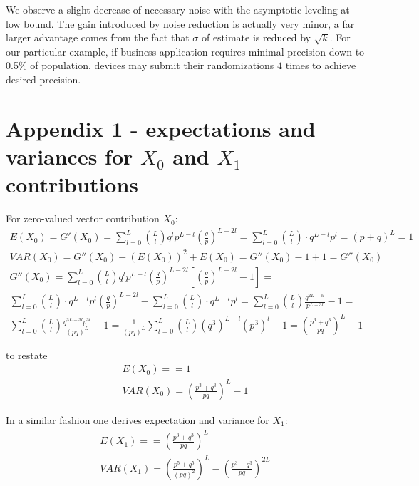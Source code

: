 \documentclass[11pt]{article}
\begin{document}
 We observe a slight decrease of necessary noise with the asymptotic leveling at low bound.  The gain introduced by noise reduction is actually very minor, a far larger advantage comes from the fact that $\sigma$ of estimate is reduced by $\sqrt{k}$.  For our particular example, if business application requires minimal precision down to 0.5\% of population, devices may submit their randomizations $4$ times to achieve desired precision.

\section{Appendix 1 - expectations and variances for $X_0$ and $X_1$ contributions}

For zero-valued vector contribution $X_0$:
\begin{align}
E(X_0)=  G'(X_0) = \sum_{l=0}^{L} \binom{L}{l} q^lp^{L-l} \left ( \frac{q}{p} \right )^ {L - 2l} = \sum_{l=0}^{L}  \binom{L}{l} \cdot q^{L-l}p^{l} = (p+q)^L = 1 \\
VAR(X_0)=  G''(X_0) - (E(X_0))^2 + E(X_0) = G''(X_0) - 1 + 1 =  G''(X_0) \\
 G''(X_0) = \sum_{l=0}^{L} \binom{L}{l} q^lp^{L-l} \left ( \frac{q}{p} \right )^ {L - 2l} \left [  \left ( \frac{q}{p} \right )^ {L - 2l} - 1 \right ] = \\
  \sum_{l=0}^{L}  \binom{L}{l} \cdot q^{L-l}p^{l}  \left ( \frac{q}{p} \right )^ {L - 2l}  - \sum_{l=0}^{L}  \binom{L}{l} \cdot q^{L-l}p^{l}  =   \sum_{l=0}^{L}  \binom{L}{l}   \frac{q^{2L-3l}}{p^{L-3l}}  - 1 = \\
\sum_{l=0}^{L}  \binom{L}{l}   \frac{q^{3L-3l} p^{3l}}{(pq)^{L}} - 1 =  \frac{1}{(pq)^{L}} \sum_{l=0}^{L}  \binom{L}{l}   (q^3)^{L-l} (p^3)^{l} - 1 = \left ( \frac{p^3 + q^3}{pq} \right )^L - 1
\end{align}

to restate
\begin{align}
E(X_0)=  = 1 \\
VAR(X_0) = \left ( \frac{p^3 + q^3}{pq} \right )^L - 1
\end{align}

In a similar fashion one derives expectation and variance for $X_1$:
\begin{align}
E(X_1)=  =   \left ( \frac{p^3 + q^3}{pq} \right )^L\\
VAR(X_1) = \left ( \frac{p^5 + q^5}{(pq)^2} \right )^{L}  - \left ( \frac{p^3 + q^3}{pq} \right )^{2L} 
\end{align}
\end{document}
